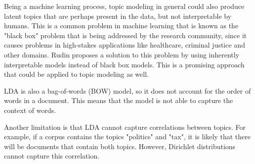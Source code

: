 Being a machine learning process, topic modeling in general could also produce latent topics that are perhaps present in the data, but not interpretable by humans. This is a common problem in machine learning that is known as the "black box" problem that is being addressed by the research community, since it causes problems in high-stakes applications like healthcare, criminal justice and other domains. Rudin proposes a solution to this problem by using inherently interpretable models instead of black box models. This is a promising approach that could be applied to topic modeling as well.~\cite{rudin2019stop}

LDA is also a bag-of-words (BOW) model, so it does not account for the order of words in a document. This means that the model is not able to capture the context of words.

Another limitation is that LDA cannot capture correlations between topics. For example, if a corpus contains the topics "politics" and "tax", it is likely that there will be documents that contain both topics. However, Dirichlet distributions cannot capture this correlation.